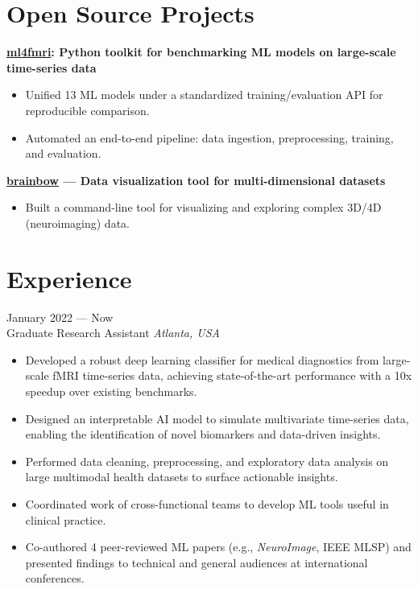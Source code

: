 \documentclass[11pt,a4paper]{article}
\begin{document}
\section*{Open Source Projects}
\noindent\textbf{\href{https://pypi.org/project/ml4fmri/}{ml4fmri}: Python toolkit for benchmarking ML models on large-scale time-series data}\\
[-2em]
\begin{itemize}[leftmargin=*,noitemsep]
    \item Unified 13 ML models under a standardized training/evaluation API for reproducible comparison.
    \item Automated an end-to-end pipeline: data ingestion, preprocessing, training, and evaluation.
\end{itemize}

\noindent\textbf{\href{https://pypi.org/project/brainbow/}{brainbow} --- Data visualization tool for multi-dimensional datasets}\\
[-2em]
\begin{itemize}[leftmargin=*,noitemsep]
    \item Built a command-line tool for visualizing and exploring complex 3D/4D (neuroimaging) data.
\end{itemize}

\section*{Experience}
 \hfill January 2022 --- Now\\
Graduate Research Assistant \hfill \textit{Atlanta, USA}\\
[-2em]
\begin{itemize}[leftmargin=*,noitemsep]
    \item Developed a robust deep learning classifier for medical diagnostics from large-scale fMRI time-series data, achieving state-of-the-art performance with a 10x speedup over existing benchmarks.
    \item Designed an interpretable AI model to simulate multivariate time-series data, enabling the identification of novel biomarkers and data-driven insights.
    \item Performed data cleaning, preprocessing, and exploratory data analysis on large multimodal health datasets to surface actionable insights.
    \item Coordinated work of cross-functional teams to develop ML tools useful in clinical practice.
    \item Co-authored 4 peer-reviewed ML papers (e.g., \textit{NeuroImage}, IEEE MLSP) and presented findings to technical and general audiences at international conferences.
\end{itemize}
\end{document}
